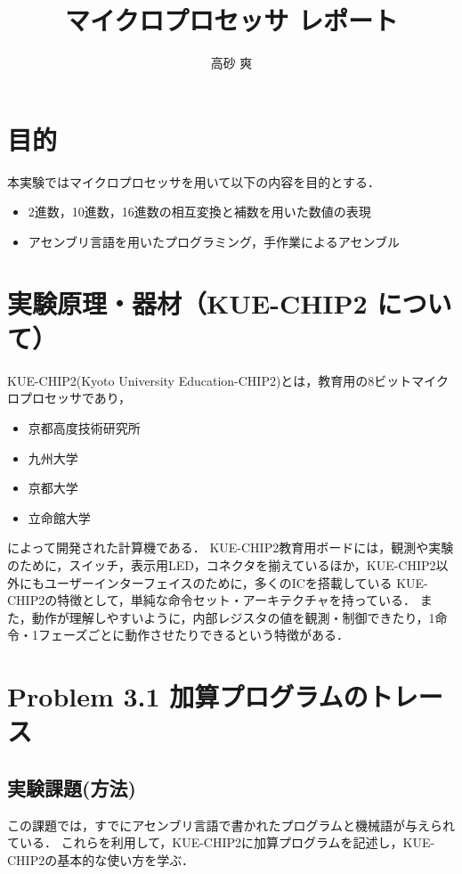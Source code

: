 \documentclass[dvipdfmx]{jsarticle}
\begin{document}
\captionsetup{subrefformat=parens}

\title{マイクロプロセッサ レポート}
\author{高砂 爽}
\maketitle

\section{目的}
本実験ではマイクロプロセッサを用いて以下の内容を目的とする．
\begin{itemize}
    \item 2進数，10進数，16進数の相互変換と補数を用いた数値の表現
    \item アセンブリ言語を用いたプログラミング，手作業によるアセンブル
\end{itemize}

\section{実験原理・器材（KUE-CHIP2 について）}
KUE-CHIP2(Kyoto University Education-CHIP2)とは，教育用の8ビットマイクロプロセッサであり，
\begin{itemize}
    \item 京都高度技術研究所
    \item 九州大学
    \item 京都大学
    \item 立命館大学
\end{itemize}
によって開発された計算機である．
KUE-CHIP2教育用ボードには，観測や実験のために，スイッチ，表示用LED，コネクタを揃えているほか，KUE-CHIP2以外にもユーザーインターフェイスのために，多くのICを搭載している
KUE-CHIP2の特徴として，単純な命令セット・アーキテクチャを持っている．
また，動作が理解しやすいように，内部レジスタの値を観測・制御できたり，1命令・1フェーズごとに動作させたりできるという特徴がある．


\section{Problem 3.1 加算プログラムのトレース}
\subsection{実験課題(方法)}
この課題では，すでにアセンブリ言語で書かれたプログラムと機械語が与えられている．
これらを利用して，KUE-CHIP2に加算プログラムを記述し，KUE-CHIP2の基本的な使い方を学ぶ．
\end{document}
